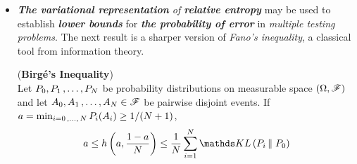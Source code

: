 \documentclass[11pt]{article}
\begin{document}
\begin{itemize}
\item \begin{remark}
\emph{\textbf{The variational representation} of \textbf{relative entropy}} may be used to establish \emph{\textbf{lower bounds}} for \emph{\textbf{the probability of error}} in \emph{multiple testing problems}. The next result is a sharper version of \emph{Fano's inequality}, a classical tool from information theory.
\end{remark}

\begin{proposition} (\textbf{Birg{\'e}'s Inequality})  \citep{boucheron2013concentration}\\
Let $P_0, P_1 \,{,}\ldots{,}\, P_N$ be probability distributions on measurable space $(\Omega, {\mathscr F})$  and let $A_0, A_1 \,{,}\ldots{,}\, A_N \in {\mathscr F}$ be pairwise disjoint events. If $a = \min_{i=0 \,{,}\ldots{,}\, N}P_{i}(A_i) \ge 1/(N+1)$,
\begin{align}
a \le h\paren{a, \frac{1 - a}{N}} \le \frac{1}{N}\sum_{i=1}^{N}\kl{P_i}{P_0} \label{ineqn: birge_inequality}
\end{align}
\end{proposition}


\end{itemize}

\newpage


\end{document}
